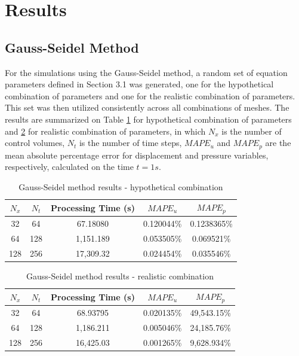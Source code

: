 \documentclass[sn-mathphys]{sn-jnl}%
\theoremstyle{thmstyleone}%
\theoremstyle{thmstyletwo}%
\theoremstyle{thmstylethree}%
\begin{document}
\section{Results}
\subsection{Gauss-Seidel Method} \label{section:Gauss-Seidel result}

For the simulations using the Gauss-Seidel method, a random set of equation parameters defined in Section 3.1 was generated, one for the hypothetical combination of parameters and one for the realistic combination of parameters. This set was then utilized consistently across all combinations of meshes. The results are summarized on Table \ref{tab:GS results E1K1} for hypothetical combination of parameters and \ref{tab:GS results} for realistic combination of parameters, in which \(N_x\) is the number of control volumes, \(N_t\) is the number of time steps, \(MAPE_u\) and \(MAPE_p\) are the mean absolute percentage error for displacement and pressure variables, respectively, calculated on the time \(t=1 s\).

\begin{table}[h]
  \centering
  \begin{tabular}{|c|c|c|c|c|}
    \hline
    \(N_x\) & \(N_t\) & Processing Time (s) & \(MAPE_u\) & \(MAPE_p\)\\
    \hline
    32 & 64 & 67.18080 & 0.120044\% & 0.1238365\% \\
    \hline
    64 & 128 & 1,151.189 & 0.053505\% & 0.069521\% \\
    \hline
    128 & 256 & 17,309.32 & 0.024454\% & 0.035546\% \\
    \hline
  \end{tabular}
  \caption{Gauss-Seidel method results - hypothetical combination}
  \label{tab:GS results E1K1}
\end{table}

\begin{table}[h]
  \centering
  \begin{tabular}{|c|c|c|c|c|}
    \hline
    \(N_x\) & \(N_t\) & Processing Time (s) & \(MAPE_u\) & \(MAPE_p\)\\
    \hline
    32 & 64 & 68.93795 & 0.020135\% & 49,543.15\% \\
    \hline
    64 & 128 & 1,186.211 & 0.005046\% & 24,185.76\% \\
    \hline
    128 & 256 & 16,425.03 & 0.001265\% & 9,628.934\% \\
    \hline
  \end{tabular}
  \caption{Gauss-Seidel method results - realistic combination}
  \label{tab:GS results}
\end{table}
\end{document}
